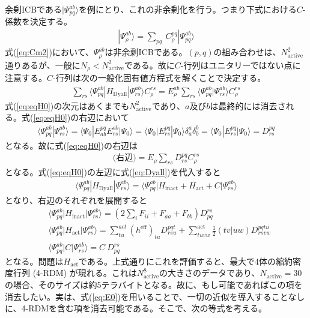\documentclass[11pt,pra,aps]{revtex4}
\begin{document}
余剰ICBである$|\Psi_{pq}^{ab}\rangle$を例にとり、これの非余剰化を行う。つまり下式における$C$-係数を決定する。
\begin{align}
  |\Psi_{\rho}^{ab}\rangle=\sum_{pq} \ C_{\rho}^{pq} |\Psi_{pq}^{ab}\rangle \label{eq:Cm2}
\end{align}
式(\ref{eq:Cm2})において、$\Psi_{\rho}^{ab}$は非余剰ICBである。$(p,q)$の組み合わせは、$N_\text{active}^2$通りあるが、一般に$N_\rho<N_\text{active}^2$である。故に$C$-行列はユニタリーではない点に注意する。$C$-行列は次の一般化固有値方程式を解くことで決定する。
\begin{align}
  \sum_{rs} \langle\Psi_{pq}^{ab}|H_\text{Dyall}|\Psi_{rs}^{ab}\rangle C_\rho^{rs}=E_{\rho}^{ab}\sum_{rs} \langle\Psi_{pq}^{ab}|\Psi_{rs}^{ab}\rangle C_\rho^{rs} \label{eq:eqH0}
\end{align}
式(\ref{eq:eqH0})の次元はあくまでも$N_\text{active}^2$であり、$a$及び$b$は最終的には消去される。式(\ref{eq:eqH0})の右辺において
\begin{align}
  \langle\Psi_{pq}^{ab}|\Psi_{rs}^{ab}\rangle = \langle\Psi_0|E^{pq}_{ab}E_{rs}^{ab}|\Psi_0\rangle = \langle\Psi_0|E^{pq}_{rs}|\Psi_0\rangle \delta_a^a \delta_b^b = \langle\Psi_0|E^{pq}_{rs}|\Psi_0\rangle = D_{rs}^{pq}
\end{align}
となる。故に式(\ref{eq:eqH0})の右辺は
\begin{align}
  \text{(右辺)}=E_\rho\sum_{rs} D^{pq}_{rs} C_\rho^{rs}
\end{align}
となる。式(\ref{eq:eqH0})の左辺に式(\ref{eq:Dyall})を代入すると
\begin{align}
  \langle\Psi_{pq}^{ab}|H_\text{Dyall}|\Psi_{rs}^{ab}\rangle = \langle\Psi_{pq}^{ab}|H_\text{inact}+H_\text{act}+C|\Psi_{rs}^{ab}\rangle
\end{align}
となり、右辺のそれぞれを展開すると
\begin{align}
  &\langle\Psi_{pq}^{ab}|H_\text{inact}|\Psi_{rs}^{ab}\rangle=\left(2\sum_i F_{ii}+F_{aa}+F_{bb}\right)D^{rs}_{pq} \label{eq:inact} \\
  &\langle\Psi_{pq}^{ab}|H_\text{act}  |\Psi_{rs}^{ab}\rangle=\sum_{tu}^{act} (h^\text{eff})_{tu} D^{pqt}_{rsu} + \sum_{tuvw}^\text{act} \frac{1}{2}(tv|uw) D^{pqtu}_{rsvw} \label{eq:nocommH0}\\ 
  &\langle\Psi_{pq}^{ab}|C|\Psi_{rs}^{ab}\rangle=C \ D^{rs}_{pq} \label{eq:C}
\end{align}
となる。問題は$H_\text{act}$である。上式通りにこれを評価すると、最大で4体の縮約密度行列 (4-RDM) が現れる。これは$N_\text{active}^8$の大きさのデータであり、$N_\text{active}=30$の場合、そのサイズは約5テラバイトとなる。故に、もし可能であればこの項を消去したい。実は、式(\ref{eq:E0})を用いることで、一切の近似を導入することなしに、4-RDMを含む項を消去可能である。そこで、次の等式を考える。
\end{document}
